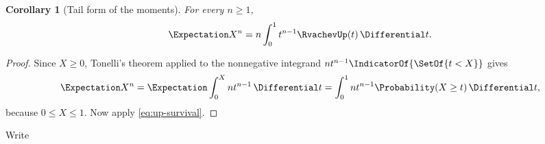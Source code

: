 \documentclass[11pt,a4paper,oneside,openany]{book}
\newtheorem{corollary}[corollary]{Corollary}
\theoremstyle{definition}
\theoremstyle{remark}
\begin{document}
\begin{corollary}[Tail form of the moments]\label{cor:up-moments}
For every $n\ge1$,
\begin{equation}\label{eq:up-moment-integral}
 \Expectation X^n=n\int_0^1t^{n-1}\RvachevUp(t)\,\Differential t.
\end{equation}
\end{corollary}

\begin{proof}
Since $X\ge0$, Tonelli's theorem applied to the nonnegative integrand
$nt^{n-1}\IndicatorOf{\SetOf{t<X}}$ gives
\[
 \Expectation X^n
 =\Expectation\int_0^Xnt^{n-1}\,\Differential t
 =\int_0^1nt^{n-1}\Probability(X\ge t)\,\Differential t,
\]
because $0\le X\le1$.  Now apply \eqref{eq:up-survival}.
\end{proof}

Write
\end{document}

